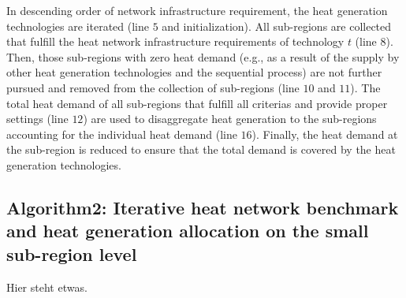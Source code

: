 In descending order of network infrastructure requirement, the heat generation technologies are iterated (line $5$ and initialization). All sub-regions are collected that fulfill the heat network infrastructure requirements of technology $t$ (line $8$). Then, those sub-regions with zero heat demand (e.g., as a result of the supply by other heat generation technologies and the sequential process) are not further pursued and removed from the collection of sub-regions (line $10$ and $11$). The total heat demand of all sub-regions that fulfill all criterias and provide proper settings (line $12$) are used to disaggregate heat generation to the sub-regions accounting for the individual heat demand (line $16$). Finally, the heat demand at the sub-region is reduced to ensure that the total demand is covered by the heat generation technologies. 

\subsection{Algorithm2: Iterative heat network benchmark and heat generation allocation on the small sub-region level}
Hier steht etwas.



